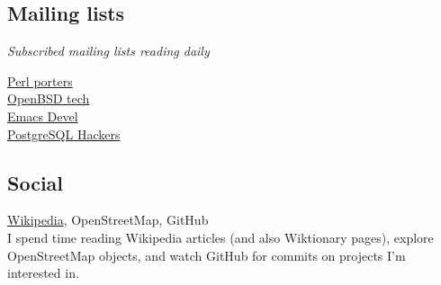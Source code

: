 \documentclass {article}
\begin{document}
    \subsection{Mailing lists}
    \textit{Subscribed mailing lists reading daily}
    \begin{description}
        \item[\href{https://lists.perl.org/list/perl5-porters.html}{Perl porters}]
        \item[\href{https://www.openbsd.org/mail.html}{OpenBSD tech}]
        \item[\href{https://lists.gnu.org/mailman/listinfo/emacs-devel}{Emacs Devel}]
        \item[\href{https://www.postgresql.org/list/pgsql-hackers/}{PostgreSQL Hackers}]
    \end{description}

    \subsection{Social}
    \href{https://en.wikipedia.org/wiki/User:Rwp0}{Wikipedia}, OpenStreetMap, GitHub\\
    I spend time reading Wikipedia articles (and also Wiktionary pages), explore OpenStreetMap objects, and watch GitHub for commits on projects I'm interested in.

    {} %
\end{document}
